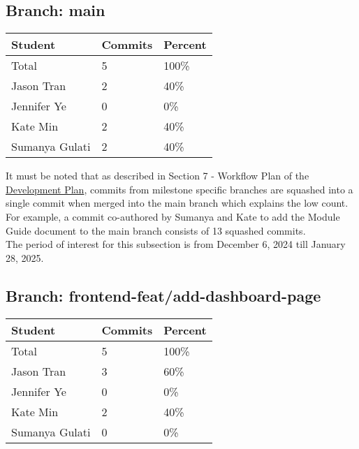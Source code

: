 \documentclass{article}
\begin{document}
\subsection{Branch: main} \label{sec:main}

\begin{table}[H]
\centering
\begin{tabular}{lll}
\toprule
\textbf{Student} & \textbf{Commits} & \textbf{Percent}\\
\midrule
Total & 5 & 100\% \\
Jason Tran & 2 & 40\% \\
Jennifer Ye & 0 & 0\% \\
Kate Min & 2 & 40\% \\
Sumanya Gulati & 2 & 40\% \\
\bottomrule
\end{tabular}
\end{table}

It must be noted that as described in Section 7 - Workflow Plan of the 
\href{https://github.com/SumanyaG/Alkalytics/blob/main/docs/DevelopmentPlan/DevelopmentPlan.pdf}{Development Plan},
commits from milestone specific branches are squashed into a single commit when merged into the
main branch which explains the low count. For example, a commit co-authored by Sumanya and Kate 
to add the Module Guide document to the main branch consists of 13 squashed commits.\\

The period of interest for this subsection is from December 6, 2024 till January 28, 2025. 

\subsection{Branch: frontend-feat/add-dashboard-page} \label{sec:dashboard}

\begin{table}[H]
\centering
\begin{tabular}{lll}
\toprule
\textbf{Student} & \textbf{Commits} & \textbf{Percent}\\
\midrule
Total & 5 & 100\% \\
Jason Tran & 3 & 60\% \\
Jennifer Ye & 0 & 0\% \\
Kate Min & 2 & 40\% \\
Sumanya Gulati & 0 & 0\% \\
\bottomrule
\end{tabular}
\end{table}
\end{document}
